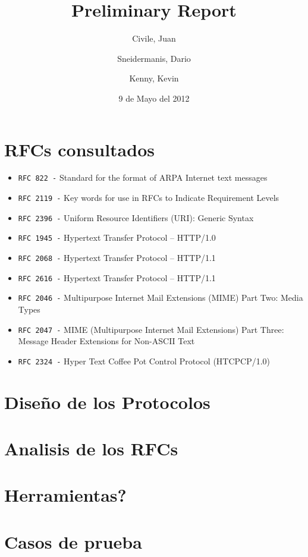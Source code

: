 \documentclass[11pt,a4paper,titlepage]{article}
\title{Preliminary Report}
\author{Civile, Juan \and Sneidermanis, Dario \and Kenny, Kevin}
\date{9 de Mayo del 2012}
\begin{document}
\newcommand{\awesome}[1]{\texttt{\large #1 -}}

\maketitle
\tableofcontents
\clearpage

\section{RFCs consultados}

\begin{itemize}

    \item \awesome{RFC 822}  Standard for the format of ARPA Internet text messages
    \item \awesome{RFC 2119} Key words for use in RFCs to Indicate Requirement Levels
    \item \awesome{RFC 2396} Uniform Resource Identifiers (URI): Generic Syntax
    \item \awesome{RFC 1945} Hypertext Transfer Protocol -- HTTP/1.0
    \item \awesome{RFC 2068} Hypertext Transfer Protocol -- HTTP/1.1
    \item \awesome{RFC 2616} Hypertext Transfer Protocol -- HTTP/1.1
    \item \awesome{RFC 2046} Multipurpose Internet Mail Extensions (MIME) Part Two: Media Types
    \item \awesome{RFC 2047} MIME (Multipurpose Internet Mail Extensions) Part Three: Message Header Extensions for Non-ASCII Text
    \item \awesome{RFC 2324} Hyper Text Coffee Pot Control Protocol (HTCPCP/1.0)

\end{itemize}

\section{Diseño de los Protocolos}

\section{Analisis de los RFCs}

\section{Herramientas?}

\section{Casos de prueba}
\end{document}

